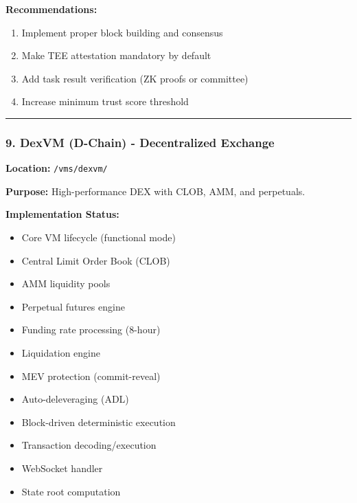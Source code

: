 \documentclass[
]{article}
\providecommand{\tightlist}{%
  \setlength{\itemsep}{0pt}\setlength{\parskip}{0pt}}
\begin{document}
\textbf{Recommendations:}

\begin{enumerate}
\def\labelenumi{\arabic{enumi}.}
\tightlist
\item
  Implement proper block building and consensus
\item
  Make TEE attestation mandatory by default
\item
  Add task result verification (ZK proofs or committee)
\item
  Increase minimum trust score threshold
\end{enumerate}

\begin{center}\rule{0.5\linewidth}{0.5pt}\end{center}

\subsubsection{9. DexVM (D-Chain) - Decentralized
Exchange}\label{9-dexvm-d-chain---decentralized-exchange}

\textbf{Location:} \texttt{/vms/dexvm/}

\textbf{Purpose:} High-performance DEX with CLOB, AMM, and perpetuals.

\textbf{Implementation Status:}

\begin{itemize}
\tightlist
\item[$\boxtimes$]
  Core VM lifecycle (functional mode)
\item[$\boxtimes$]
  Central Limit Order Book (CLOB)
\item[$\boxtimes$]
  AMM liquidity pools
\item[$\boxtimes$]
  Perpetual futures engine
\item[$\boxtimes$]
  Funding rate processing (8-hour)
\item[$\boxtimes$]
  Liquidation engine
\item[$\boxtimes$]
  MEV protection (commit-reveal)
\item[$\boxtimes$]
  Auto-deleveraging (ADL)
\item[$\boxtimes$]
  Block-driven deterministic execution
\item[$\square$]
  Transaction decoding/execution
\item[$\square$]
  WebSocket handler
\item[$\square$]
  State root computation
\end{itemize}
\end{document}
